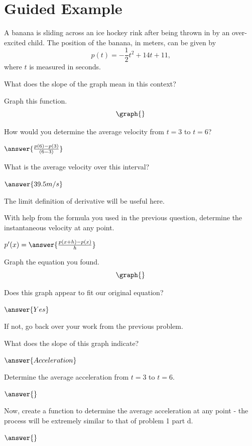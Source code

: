 \documentclass{ximera}
\begin{document}
\section{Guided Example}
\begin{question}
A banana is sliding across an ice hockey rink after being thrown in by an over-excited child. The position of the banana, in meters, can be given by $$p(t) = -\dfrac{1}{2}t^2+14t+11\text{,}$$ where $t$ is measured in seconds.

What does the slope of the graph mean in this context?
\begin{freeResponse}
\end{freeResponse}

Graph this function.
\[
    \graph{}
\]

How would you determine the average velocity from $t = 3$ to $t = 6$?

$\answer{\frac{p(6)-p(3)}{(6-3)}}$

What is the average velocity over this interval?

$\answer{39.5 m/s}$

\begin{hint}
The limit definition of derivative will be useful here.
\end{hint}
With help from the formula you used in the previous question, determine the instantaneous velocity at any point.

$p'(x) =  \answer{\frac{p(x+h)-p(x)}{h}}$


Graph the equation you found.
\[
    \graph{}
\]

Does this graph appear to fit our original equation?

$\answer{Yes}$

If not, go back over your work from the previous problem.


What does the slope of this graph indicate?

$\answer{Acceleration}$

Determine the average acceleration from $t = 3$ to $t = 6$.

$\answer{}$

Now, create a function to determine the average acceleration at any point - the process will be extremely similar to that of problem 1 part d.

$\answer{}$
\end{question}
\end{document}
